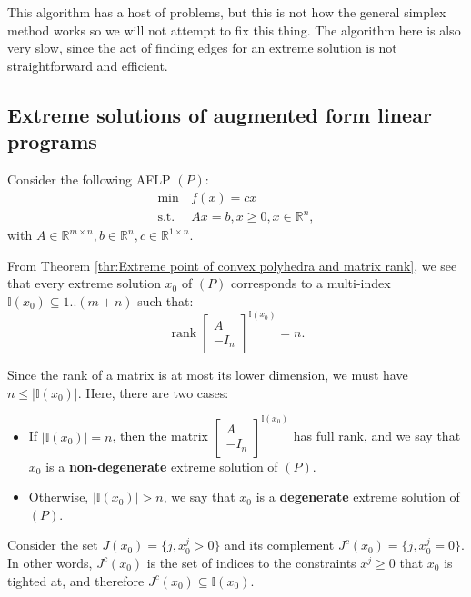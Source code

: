 This algorithm has a host of problems, but this is not how the general simplex
method works so we will not attempt to fix this thing. The algorithm here is
also very slow, since the act of finding edges for an extreme solution is not
straightforward and efficient.


\subsection{Extreme solutions of augmented form linear programs} %
\label{sub:Extreme solutions of augmented form linear programs}

Consider the following AFLP \( (P) \):
\begin{align*}
  \min\, &f(x) = cx\\
  \text{s.t.}\, &Ax = b, x \ge 0, x\in \mathbb{R}^{n},
\end{align*} with \( A \in \mathbb{R}^{m \times  n}, b \in \mathbb{R}^{n}, c \in
\mathbb{R}^{1\times  n}\).

From Theorem \ref{thr:Extreme point of convex polyhedra and matrix rank}, we see
that every extreme solution \( x_{0} \) of \( (P) \) corresponds to a
multi-index \( \mathbb{I}(x_{0}) \subseteq 1..(m + n) \) such that:
\[
  \operatorname{rank} \begin{bmatrix} A \\ -I_{n}
  \end{bmatrix}^{\mathbb{I}(x_{0})} = n
.\] 

Since the rank of a matrix is at most its lower dimension, we must have \( n \le
|\mathbb{I}(x_{0})|\). Here, there are two cases:

\begin{itemize}
  \item If \( |\mathbb{I}(x_{0})| = n \), then the matrix \( \begin{bmatrix} A
  \\ -I_{n} \end{bmatrix} ^{\mathbb{I}(x_{0})} \) has full rank, and we say that
  \( x_{0} \) is a \textbf{non-degenerate} extreme solution of \( (P) \).
\item Otherwise, \( |\mathbb{I}(x_{0})| > n \), we say that \( x_{0} \) is a
  \textbf{degenerate} extreme solution of \( (P) \).
\end{itemize}

Consider the set \( J(x_{0}) = \{j, x_{0}^{j} > 0 \}   \) and its complement \(
J^{c}(x_{0}) = \{j, x_{0}^{j} = 0\}  \). In other words, \( J^{c}(x_{0}) \) is
the set of indices to the constraints \( x^{j} \ge 0 \) that \( x_{0} \) is
tighted at, and therefore \( J^{c}(x_{0}) \subseteq \mathbb{I}(x_{0}) \).

